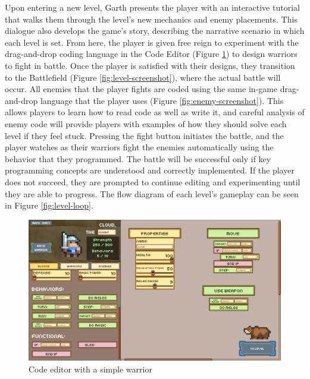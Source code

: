 \documentclass[10pt,twocolumn]{article}
\begin{document}
Upon entering a new level, Garth presents the player with an interactive tutorial that walks them through the level’s new mechanics and enemy placements. This dialogue also develops the game’s story, describing the narrative scenario in which each level is set. From here, the player is given free reign to experiment with the drag-and-drop coding language in the Code Editor (Figure \ref{fig:code-editor-screenshot}) to design warriors to fight in battle. Once the player is satisfied with their designs, they transition to the Battlefield (Figure \ref{fig:level-screenshot}), where the actual battle will occur. All enemies that the player fights are coded using the same in-game drag-and-drop language that the player uses (Figure \ref{fig:enemy-screenshot}). This allows players to learn how to read code as well as write it, and careful analysis of enemy code will provide players with examples of how they should solve each level if they feel stuck. Pressing the fight button initiates the battle, and the player watches as their warriors fight the enemies automatically using the behavior that they programmed. The battle will be successful only if key programming concepts are understood and correctly implemented. If the player does not succeed, they are prompted to continue editing and experimenting until they are able to progress. The flow diagram of each level’s gameplay can be seen in Figure \ref{fig:level-loop}.

\begin{figure}
    \centering
    \includegraphics[width=\linewidth]{images/screenshots/cloud_editor.png}
    \caption{Code editor with a simple warrior}
    \label{fig:code-editor-screenshot}
\end{figure}
\end{document}
